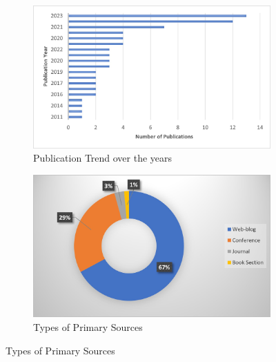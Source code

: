 \begin{figure}
  \begin{subfigure}[b]{0.45\linewidth}
	\centering
	\includegraphics[width=\linewidth]{PublicationTrend.jpg}
	\caption{Publication Trend over the years}
	\Description{}
	\label{fig:Trend}
  \end{subfigure}
\hfill
  \begin{subfigure}[b]{0.45\linewidth}
	\centering
	\includegraphics[width=\linewidth]{TypeSources.jpg}
	\caption{Types of Primary Sources}
	\Description{}
	\label{fig:Sources}
  \end{subfigure}
\end{figure}




